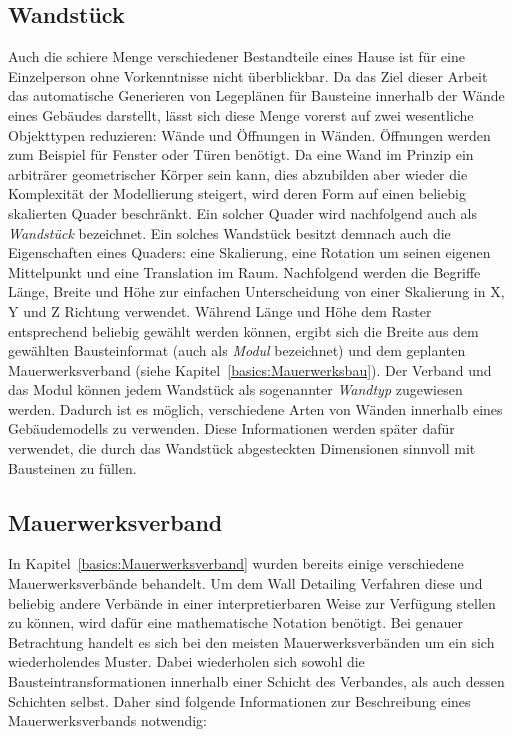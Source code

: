 \subsection{Wandstück}
Auch die schiere Menge verschiedener Bestandteile eines Hause ist für eine Einzelperson ohne Vorkenntnisse nicht überblickbar.
Da das Ziel dieser Arbeit das automatische Generieren von Legeplänen für Bausteine innerhalb der Wände eines Gebäudes darstellt, lässt sich diese Menge vorerst auf zwei wesentliche Objekttypen reduzieren:
Wände und Öffnungen in Wänden.
Öffnungen werden zum Beispiel für Fenster oder Türen benötigt.
Da eine Wand im Prinzip ein arbiträrer geometrischer Körper sein kann, dies abzubilden aber wieder die Komplexität der Modellierung steigert, wird deren Form auf einen beliebig skalierten Quader beschränkt.
Ein solcher Quader wird nachfolgend auch als \textit{Wandstück} bezeichnet.
Ein solches Wandstück besitzt demnach auch die Eigenschaften eines Quaders: eine Skalierung, eine Rotation um seinen eigenen Mittelpunkt und eine Translation im Raum.
Nachfolgend werden die Begriffe Länge, Breite und Höhe zur einfachen Unterscheidung von einer Skalierung in X, Y und Z Richtung verwendet.
Während Länge und Höhe dem Raster entsprechend beliebig gewählt werden können, ergibt sich die Breite aus dem gewählten Bausteinformat (auch als \textit{Modul} bezeichnet) und dem geplanten Mauerwerksverband (siehe Kapitel~\ref{basics:Mauerwerksbau}).
Der Verband und das Modul können jedem Wandstück als sogenannter \textit{Wandtyp} zugewiesen werden.
Dadurch ist es möglich, verschiedene Arten von Wänden innerhalb eines Gebäudemodells zu verwenden.
Diese Informationen werden später dafür verwendet, die durch das Wandstück abgesteckten Dimensionen sinnvoll mit Bausteinen zu füllen.

\subsection{Mauerwerksverband}\label{concept:mauerwerksverband}
In Kapitel~\ref{basics:Mauerwerksverband} wurden bereits einige verschiedene Mauerwerksverbände behandelt.
Um dem Wall Detailing Verfahren diese und beliebig andere Verbände in einer interpretierbaren Weise zur Verfügung stellen zu können, wird dafür eine mathematische Notation benötigt.
Bei genauer Betrachtung handelt es sich bei den meisten Mauerwerksverbänden um ein sich wiederholendes Muster.
Dabei wiederholen sich sowohl die Bausteintransformationen innerhalb einer Schicht des Verbandes, als auch dessen Schichten selbst.
Daher sind folgende Informationen zur Beschreibung eines Mauerwerksverbands notwendig:

